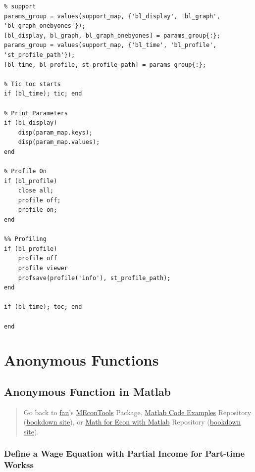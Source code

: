 \documentclass[
]{book}
\begin{document}
\begin{verbatim}
% support
params_group = values(support_map, {'bl_display', 'bl_graph', 'bl_graph_onebyones'});
[bl_display, bl_graph, bl_graph_onebyones] = params_group{:};
params_group = values(support_map, {'bl_time', 'bl_profile', 'st_profile_path'});
[bl_time, bl_profile, st_profile_path] = params_group{:};

% Tic toc starts
if (bl_time); tic; end

% Print Parameters
if (bl_display)
    disp(param_map.keys);
    disp(param_map.values);
end

% Profile On
if (bl_profile)
    close all;
    profile off;
    profile on;
end

%% Profiling
if (bl_profile)
    profile off
    profile viewer
    profsave(profile('info'), st_profile_path);
end

if (bl_time); toc; end

end
\end{verbatim}

\hypertarget{anonymous-functions}{%
\section{Anonymous Functions}\label{anonymous-functions}}

\hypertarget{anonymous-function-in-matlab}{%
\subsection{Anonymous Function in Matlab}\label{anonymous-function-in-matlab}}

\begin{quote}
Go back to \href{http://fanwangecon.github.io/}{fan}'s \href{https://fanwangecon.github.io/MEconTools/}{MEconTools} Package, \href{https://fanwangecon.github.io/M4Econ/}{Matlab Code Examples} Repository (\href{https://fanwangecon.github.io/M4Econ/bookdown}{bookdown site}), or \href{https://fanwangecon.github.io/Math4Econ/}{Math for Econ with Matlab} Repository (\href{https://fanwangecon.github.io/Math4Econ/bookdown}{bookdown site}).
\end{quote}

\hypertarget{define-a-wage-equation-with-partial-income-for-part-time-workss}{%
\subsubsection{Define a Wage Equation with Partial Income for Part-time Workss}\label{define-a-wage-equation-with-partial-income-for-part-time-workss}}
\end{document}
